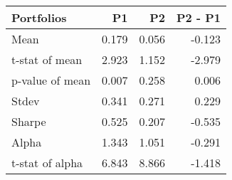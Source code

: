 \begin{tabular}{lrrr}
\toprule
Portfolios & P1 & P2 & P2 - P1 \\
\midrule
Mean & 0.179 & 0.056 & -0.123 \\
t-stat of mean & 2.923 & 1.152 & -2.979 \\
p-value of mean & 0.007 & 0.258 & 0.006 \\
Stdev & 0.341 & 0.271 & 0.229 \\
Sharpe & 0.525 & 0.207 & -0.535 \\
Alpha & 1.343 & 1.051 & -0.291 \\
t-stat of alpha & 6.843 & 8.866 & -1.418 \\
\bottomrule
\end{tabular}
